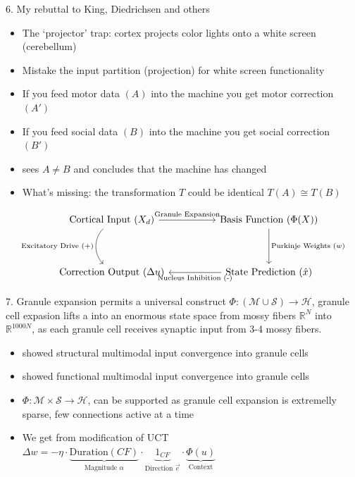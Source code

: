 \documentclass[10pt]{beamer}
\begin{document}
\begin{frame}{6. My rebuttal to King, Diedrichsen and others}
	\begin{itemize}
		\item The `projector' trap: cortex projects color lights onto a white screen (cerebellum)
		\item Mistake the input partition (projection) for white screen functionality
		\item If you feed motor data $(A)$ into the machine you get motor correction $(A')$
		\item If you feed social data $(B)$ into the machine you get social correction $(B')$
		\item \cite{diedrichsenUniversalTransformMultiple2019} sees $A \neq B$ and concludes that the machine has changed
		\item What's missing: the transformation $T$ could be identical $T(A) \cong T(B)$
	\end{itemize}
	
	\begin{equation*}
		\begin{tikzcd}[row sep=huge, column sep=huge, ampersand replacement=\&]
			\text{Cortical Input } (X_d) 
			\arrow[r, "\text{Granule Expansion}"] 
			\arrow[d, "\text{Excitatory Drive (+)}"', bend right=45] 
			\& 
			\text{Basis Function } (\Phi(X)) 
			\arrow[d, "\text{Purkinje Weights } (w)"] 
			\\
			\text{Correction Output } (\Delta u) 
			\& 
			\text{State Prediction } (\hat{x}) 
			\arrow[l, "\text{Nucleus Inhibition (-)}"]
		\end{tikzcd}
	\end{equation*}
	
\end{frame}

\begin{frame}{7. Granule expansion permits a universal construct}
	$\Phi : (\mathcal{M} \cup \mathcal{S}) \rightarrow \mathcal{H}$, granule cell expasion lifts a into an enormous state space from mossy fibers $\mathbb{R}^{N}$ into $\mathbb{R}^{1000N}$, as each granule cell receives synaptic input from 3-4 mossy fibers.
	\begin{itemize}
		\item \cite{huangConvergencePontineProprioceptive2013} showed structural multimodal input convergence into granule cells
		\item \cite{ishikawaMultimodalSensoryIntegration2015} showed functional multimodal input convergence into granule cells
		\item $\Phi : \mathcal{M} \times \mathcal{S} \rightarrow \mathcal{H}$, can be supported as granule cell expansion is extremelly sparse, few connections active at a time
		\item We get from \cite{herzfeldEncodingErrorLearning2018} modification of UCT $\Delta w = - \eta \cdot \underbrace{\text{Duration}(CF)}_{\text{Magnitude } \alpha} \cdot \underbrace{1_{CF}}_{\text{Direction } \vec{e}} \cdot \underbrace{\Phi(u)}_{\text{Context}}$
	\end{itemize}
\end{frame}
\end{document}
